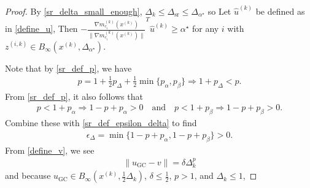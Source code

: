 \documentclass{article}
\theoremstyle{case}
\numberwithin{theorem}{subsection}
\newcommand{\dk}{\Delta_k}
\newcommand{\dsr}{{\Delta_{\textrm{sr}}}}
\newcommand{\gmcik}{{\nabla m_{c_i}^{(k)}\left(\xk\right)}}
\newcommand{\huk}{{{\hat u}^{(k)}}}
\newcommand{\mfk}{{{m}_f}^{(k)}}
\newcommand{\minanglealpha}{{ \alpha^{\star} }}
\newcommand{\minangledelta}{{\Delta_{\alpha^{\star}}}}
\newcommand{\tr}{{ B_{\infty}\left(\xk, \dk\right) }}
\newcommand{\xk}{x^{(k)}}
\newcommand{\zik}{{z^{(i, k)}}}
\begin{document}
\begin{proof}
By \cref{sr_delta_small_enough}, $\dk \le \dsr \le \minangledelta$ so 
Let $\huk$ be defined as in \cref{define_u},
Then $-\frac {\gmcik}{\|\gmcik\|} ^T\huk \ge \minanglealpha$ for any $i$ with $\zik \in B_{\infty}\left(\xk, \minangledelta\right)$.

Note that by \cref{sr_def_p}, we have
\begin{align}
p = 1 + \frac 1 2 p_{\Delta} + \frac 1 2 \min\{p_{\alpha}, p_{\beta} \} \Longrightarrow 1 + p_{\Delta} < p. \label{sr_p_big}
\end{align}
From \cref{sr_def_p}, it also follows that
\begin{align}
p < 1 + p_{\alpha} \Longrightarrow 1 - p + p_{\alpha} > 0   \quad \textrm{and} \quad
p < 1 + p_{\beta}\Longrightarrow 1 - p + p_{\beta} > 0. \label{sr_p_small_alpha_beta}
\end{align}
Combine these with \cref{sr_def_epsilon_delta} to find
\begin{align}
\epsilon_{\Delta} = \min\{1 - p + p_{\alpha}, 1 - p + p_{\beta} \} > 0 \label{sr_epsilon_delta_positive}.
\end{align}
From \cref{define_v}, we see
\begin{align}
\|u_{\textrm{GC}} - v\| = \delta \dk^{p} \label{sr_v_close_u}
\end{align}
and because $u_{\textrm{GC}} \in B_{\infty}(\xk, \frac 1 2 \dk)$, $\delta \le \frac 1 2 $, $p > 1$, and $\dk \le 1$,



% 



\end{proof}
\end{document}
